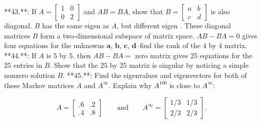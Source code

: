 **43.**: If \(A=\left[\begin{smallmatrix}1&0\\ 0&2\end{smallmatrix}\right]\) and \(AB=BA\), show that \(B=\left[\begin{smallmatrix}a&b\\ c&d\end{smallmatrix}\right]\) is also diagonal. \(B\) has the same eigen  as \(A\), but different eigen . These diagonal matrices \(B\) form a two-dimensional subspace of matrix space. \(AB-BA=0\) gives four equations for the unknowns \(\mathbf{a}\), \(\mathbf{b}\), \(\mathbf{c}\), \(\mathbf{d}\)--find the rank of the \(4\) by \(4\) matrix.
**44.**: If \(A\) is \(5\) by \(5\). then \(AB-BA=\) zero matrix gives \(25\) equations for the \(25\) entries in \(B\). Show that the \(25\) by \(25\) matrix is singular by noticing a simple nonzero solution \(B\).
**45.**: Find the eigenvalues and eigenvectors for both of these Markov matrices \(A\) and \(A^{\infty}\). Explain why \(A^{100}\) is close to \(A^{\infty}\):

\[A=\left[\begin{matrix}.6&.2\\ .4&.8\end{matrix}\right]\qquad\text{and}\qquad A^{\infty}=\left[\begin{matrix} 1/3&1/3\\ 2/3&2/3\end{matrix}\right].\]